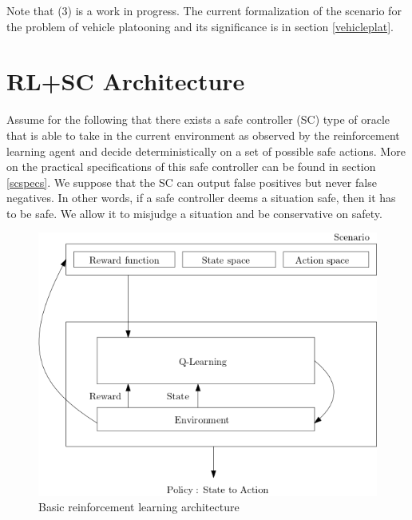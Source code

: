 \documentclass[a4paper,11pt]{article}
\begin{document}
Note that (3) is a work in progress. The current formalization of the scenario for the problem of vehicle platooning 
and its significance is in section \ref{vehicleplat}.


\section{RL+SC Architecture} \label{rlscarchitecture}
Assume for the following that there exists a safe controller (SC) type of oracle that is able to take in the current
environment as observed by the reinforcement learning agent and decide deterministically on a set of possible safe actions. 
More on the practical specifications of this safe controller can be found in section \ref{scspecs}. 
We suppose that the SC can output false positives but never false negatives. In other words, if a safe controller deems 
a situation safe, then it has to be safe. We allow it to misjudge a situation and be conservative on safety. 

\medskip 

\begin{figure}[H]
  \centering
  \includegraphics[scale=0.55]{basicrl.png}
  \caption{Basic reinforcement learning architecture}
  \label{fig:basicrl}
\end{figure}
\end{document}

